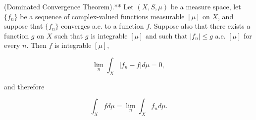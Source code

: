 (Dominated Convergence Theorem).** Let $(X, S, \mu)$ be a measure space, let $\{f_n\}$ be a sequence of complex-valued functions measurable $[\mu]$ on $X$, and suppose that $\{f_n\}$ converges a.e. to a function $f$. Suppose also that there exists a function $g$ on $X$ such that $g$ is integrable $[\mu]$ and such that $|f_n| \leq g$ a.e. $[\mu]$ for every $n$. Then $f$ is integrable $[\mu]$,

$$\lim_n \int_X |f_n - f| d\mu = 0,$$

and therefore

$$\int_X f d\mu = \lim_n \int_X f_n d\mu.$$
